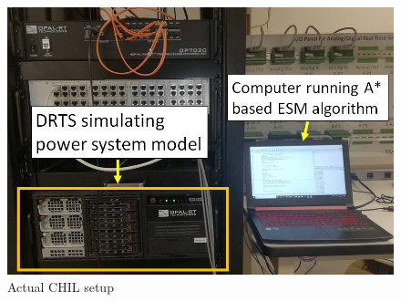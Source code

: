 \begin{figure}[!ht]
    \centering
    \includegraphics[width = \linewidth]{figs/LAB_REAL.png}
    \caption{Actual CHIL setup}
    \label{fig:LAB_REAL}
\end{figure}

